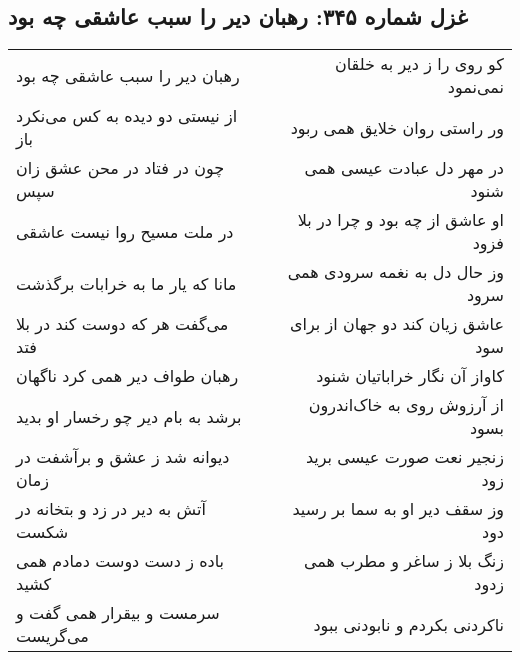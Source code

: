 \begin{center}
\section*{غزل شماره ۳۴۵: رهبان دیر را سبب عاشقی چه بود}
\label{sec:345}
\begin{longtable}{l p{0.5cm} r}
رهبان دیر را سبب عاشقی چه بود
&&
کو روی را ز دیر به خلقان نمی‌نمود
\\
از نیستی دو دیده به کس می‌نکرد باز
&&
ور راستی روان خلایق همی ربود
\\
چون در فتاد در محن عشق زان سپس
&&
در مهر دل عبادت عیسی همی شنود
\\
در ملت مسیح روا نیست عاشقی
&&
او عاشق از چه بود و چرا در بلا فزود
\\
مانا که یار ما به خرابات برگذشت
&&
وز حال دل به نغمه سرودی همی سرود
\\
می‌گفت هر که دوست کند در بلا فتد
&&
عاشق زیان کند دو جهان از برای سود
\\
رهبان طواف دیر همی کرد ناگهان
&&
کاواز آن نگار خراباتیان شنود
\\
برشد به بام دیر چو رخسار او بدید
&&
از آرزوش روی به خاک‌اندرون بسود
\\
دیوانه شد ز عشق و برآشفت در زمان
&&
زنجیر نعت صورت عیسی برید زود
\\
آتش به دیر در زد و بتخانه در شکست
&&
وز سقف دیر او به سما بر رسید دود
\\
باده ز دست دوست دمادم همی کشید
&&
زنگ بلا ز ساغر و مطرب همی زدود
\\
سرمست و بیقرار همی گفت و می‌گریست
&&
ناکردنی بکردم و نابودنی ببود
\\
\end{longtable}
\end{center}
